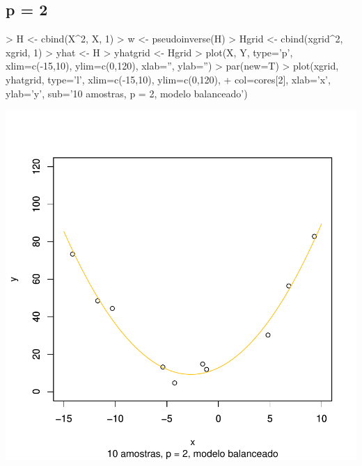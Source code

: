\documentclass{article}
\begin{document}
\subsection{p = 2}
\begin{Schunk}
\begin{Sinput}
> H <- cbind(X^2, X, 1)
> w <- pseudoinverse(H) %
> Hgrid <- cbind(xgrid^2, xgrid, 1)
> yhat <- H %
> yhatgrid <- Hgrid %
> plot(X, Y, type='p', xlim=c(-15,10), ylim=c(0,120), xlab='', ylab='')
> par(new=T)
> plot(xgrid, yhatgrid, type='l', xlim=c(-15,10), ylim=c(0,120), 
+      col=cores[2], xlab='x', ylab='y', sub='10 amostras, p = 2, modelo balanceado')
\end{Sinput}
\end{Schunk}
\includegraphics{aprox-003}
\end{document}
